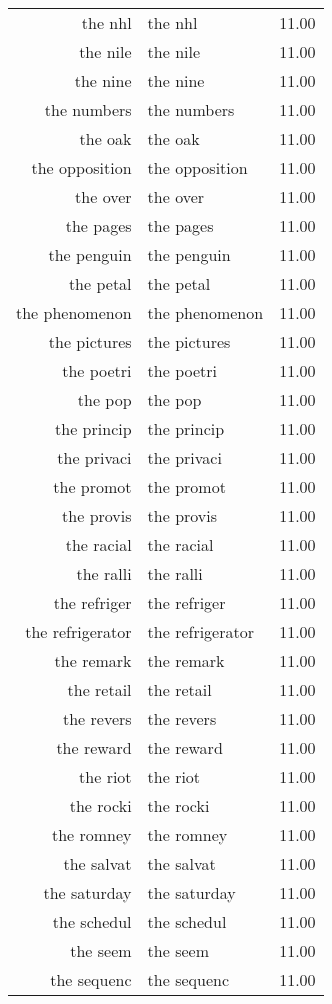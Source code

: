 \begin{table}[ht]
\begin{tabular}{rlr}
  the nhl & the nhl & 11.00 \\ 
  the nile & the nile & 11.00 \\ 
  the nine & the nine & 11.00 \\ 
  the numbers & the numbers & 11.00 \\ 
  the oak & the oak & 11.00 \\ 
  the opposition & the opposition & 11.00 \\ 
  the over & the over & 11.00 \\ 
  the pages & the pages & 11.00 \\ 
  the penguin & the penguin & 11.00 \\ 
  the petal & the petal & 11.00 \\ 
  the phenomenon & the phenomenon & 11.00 \\ 
  the pictures & the pictures & 11.00 \\ 
  the poetri & the poetri & 11.00 \\ 
  the pop & the pop & 11.00 \\ 
  the princip & the princip & 11.00 \\ 
  the privaci & the privaci & 11.00 \\ 
  the promot & the promot & 11.00 \\ 
  the provis & the provis & 11.00 \\ 
  the racial & the racial & 11.00 \\ 
  the ralli & the ralli & 11.00 \\ 
  the refriger & the refriger & 11.00 \\ 
  the refrigerator & the refrigerator & 11.00 \\ 
  the remark & the remark & 11.00 \\ 
  the retail & the retail & 11.00 \\ 
  the revers & the revers & 11.00 \\ 
  the reward & the reward & 11.00 \\ 
  the riot & the riot & 11.00 \\ 
  the rocki & the rocki & 11.00 \\ 
  the romney & the romney & 11.00 \\ 
  the salvat & the salvat & 11.00 \\ 
  the saturday & the saturday & 11.00 \\ 
  the schedul & the schedul & 11.00 \\ 
  the seem & the seem & 11.00 \\ 
  the sequenc & the sequenc & 11.00 \\ 

\end{tabular}
\end{table}
